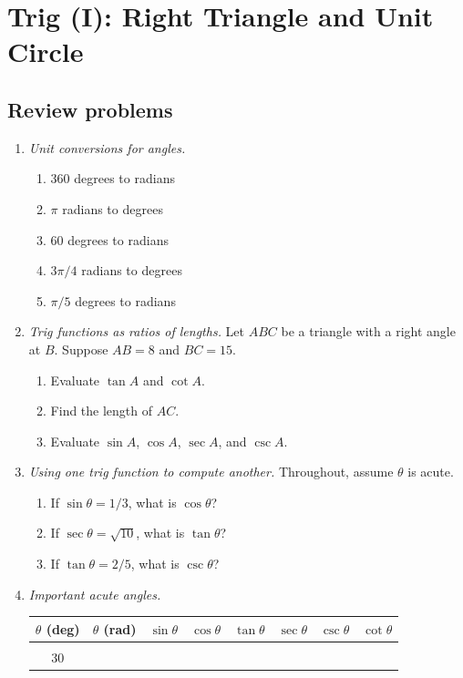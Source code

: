 \section{Trig (I): Right Triangle and Unit Circle}

\subsection{Review problems}

\begin{enumerate}
\item \emph{Unit conversions for angles.}
\begin{enumerate}
\item 360 degrees to radians
\item $\pi$ radians to degrees
\item 60 degrees to radians
\item $3\pi/4$ radians to degrees
\item $\pi/5$ degrees to radians
\end{enumerate}
\item \emph{Trig functions as ratios of lengths.} Let $ABC$ be a triangle with a right angle at $B$. Suppose $AB = 8$ and $BC = 15$.
\begin{enumerate}
\item Evaluate $\tan A$ and $\cot A$.
\item Find the length of $AC$.
\item Evaluate $\sin A$, $\cos A$, $\sec A$, and $\csc A$.
\end{enumerate}
\item \emph{Using one trig function to compute another.} Throughout, assume $\theta$ is acute.
\begin{enumerate}
\item If $\sin\theta = 1/3$, what is $\cos\theta$?
\item If $\sec\theta = \sqrt{10}$, what is $\tan\theta$?
\item If $\tan\theta = 2/5$, what is $\csc\theta$?
\end{enumerate}
\item \emph{Important acute angles.}
\begin{center}
\begin{tabular}{c|c||c|c|c|c|c|c}
$\theta$ (deg) & $\theta$ (rad) & $\sin\theta$ & $\cos\theta$ & $\tan\theta$ & $\sec\theta$ & $\csc\theta$ & $\cot\theta$ \\ \hline
 & & & & & & & \\
30 & & & & & & & \\

\end{tabular}
\end{center}
\end{enumerate}
